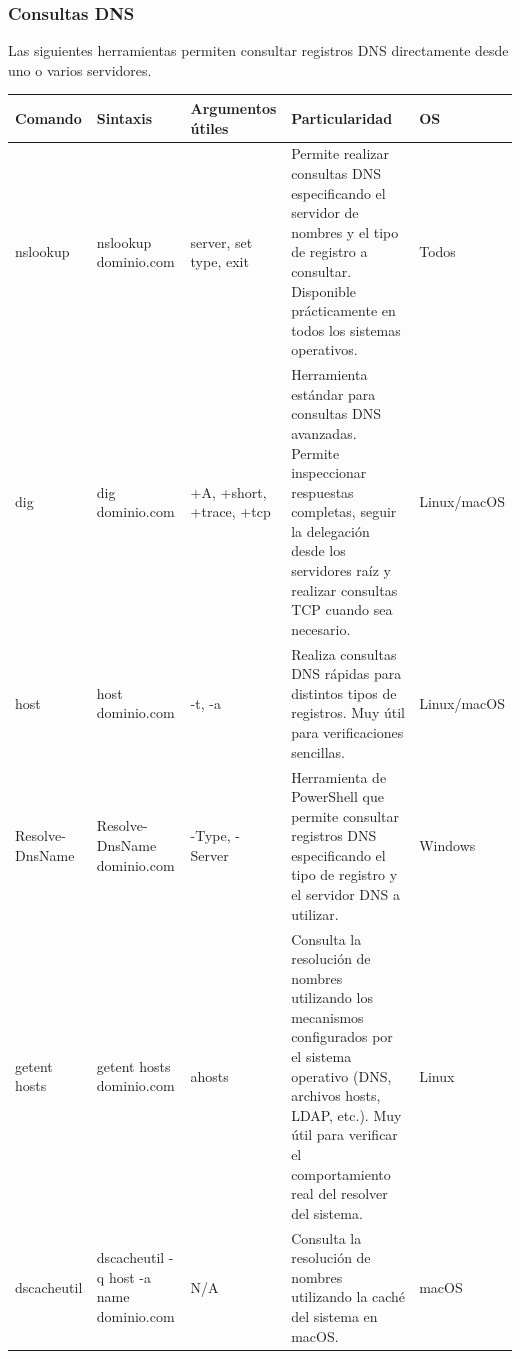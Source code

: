 \documentclass[a4paper,10pt]{article}
\begin{document}

\subsubsection{Consultas DNS}

Las siguientes herramientas permiten consultar registros DNS directamente desde
uno o varios servidores.

\begin{longtable}{|p{2.8cm}|p{3cm}|p{4cm}|p{5.6cm}|p{1.5cm}|}

\hline
Comando &
Sintaxis &
Argumentos útiles &
Particularidad &
OS
\\
\hline
\endhead

nslookup &
nslookup dominio.com &
server, set type, exit &
Permite realizar consultas DNS especificando el servidor de nombres y el tipo de registro a consultar. Disponible prácticamente en todos los sistemas operativos. &
Todos
\\
\hline

dig &
dig dominio.com &
+A, +short, +trace, +tcp &
Herramienta estándar para consultas DNS avanzadas. Permite inspeccionar respuestas completas, seguir la delegación desde los servidores raíz y realizar consultas TCP cuando sea necesario. &
Linux/macOS
\\
\hline

host &
host dominio.com &
-t, -a &
Realiza consultas DNS rápidas para distintos tipos de registros. Muy útil para verificaciones sencillas. &
Linux/macOS
\\
\hline

Resolve-DnsName &
Resolve-DnsName dominio.com &
-Type, -Server &
Herramienta de PowerShell que permite consultar registros DNS especificando el tipo de registro y el servidor DNS a utilizar. &
Windows
\\
\hline

getent hosts &
getent hosts dominio.com &
ahosts &
Consulta la resolución de nombres utilizando los mecanismos configurados por el sistema operativo (DNS, archivos hosts, LDAP, etc.). Muy útil para verificar el comportamiento real del resolver del sistema. &
Linux
\\
\hline

dscacheutil &
dscacheutil -q host -a name dominio.com &
N/A &
Consulta la resolución de nombres utilizando la caché del sistema en macOS. &
macOS
\\
\hline

\end{longtable}
\end{document}
